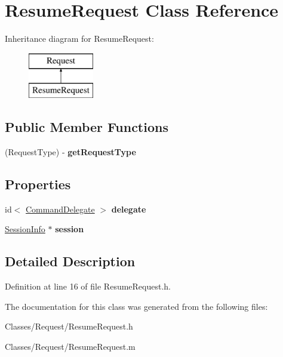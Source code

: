 \hypertarget{interface_resume_request}{
\section{ResumeRequest Class Reference}
\label{interface_resume_request}
}
Inheritance diagram for ResumeRequest:\begin{figure}[H]
\begin{center}
\leavevmode
\includegraphics[height=2.000000cm]{interface_resume_request}
\end{center}
\end{figure}
\subsection*{Public Member Functions}
\begin{DoxyCompactItemize}
\item 
\hypertarget{interface_resume_request_a2435d6218c1be36166236f0147a5f6f6}{
(RequestType) -\/ {\bfseries getRequestType}}
\label{interface_resume_request_a2435d6218c1be36166236f0147a5f6f6}

\end{DoxyCompactItemize}
\subsection*{Properties}
\begin{DoxyCompactItemize}
\item 
\hypertarget{interface_resume_request_af7f6dd890bdb858a410c836e0fc38d9f}{
id$<$ \hyperlink{protocol_command_delegate-p}{CommandDelegate} $>$ {\bfseries delegate}}
\label{interface_resume_request_af7f6dd890bdb858a410c836e0fc38d9f}

\item 
\hypertarget{interface_resume_request_a31c748f365a687c074675d8a23e8477a}{
\hyperlink{interface_session_info}{SessionInfo} $\ast$ {\bfseries session}}
\label{interface_resume_request_a31c748f365a687c074675d8a23e8477a}

\end{DoxyCompactItemize}


\subsection{Detailed Description}


Definition at line 16 of file ResumeRequest.h.



The documentation for this class was generated from the following files:\begin{DoxyCompactItemize}
\item 
Classes/Request/ResumeRequest.h\item 
Classes/Request/ResumeRequest.m\end{DoxyCompactItemize}
